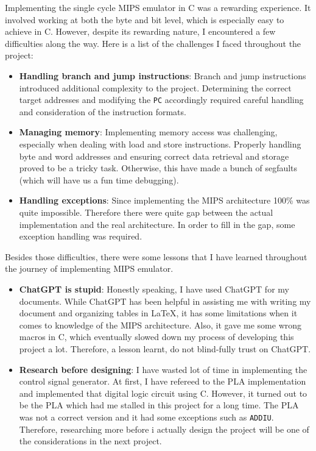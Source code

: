 \documentclass{homework}
\begin{document}
Implementing the single cycle MIPS emulator in C was a rewarding experience. It involved working at both the byte and bit level, which is especially easy to achieve in C. However, despite its rewarding nature, I encountered a few difficulties along the way. Here is a list of the challenges I faced throughout the project:

\begin{itemize}
    \item \textbf{Handling branch and jump instructions}: Branch and jump instructions introduced additional complexity to the project. Determining the correct target addresses and modifying the \texttt{PC} accordingly required careful handling and consideration of the instruction formats.
    \item \textbf{Managing memory}: Implementing memory access was challenging, especially when dealing with load and store instructions. Properly handling byte and word addresses and ensuring correct data retrieval and storage proved to be a tricky task. Otherwise, this have made a bunch of segfaults (which will have us a fun time debugging).
    \item \textbf{Handling exceptions}: Since implementing the MIPS architecture 100\% was quite impossible. Therefore there were quite gap between the actual implementation and the real architecture. In order to fill in the gap, some exception handling was required. 
\end{itemize}
Besides those difficulties, there were some lessons that I have learned throughout the journey of implementing MIPS emulator. 

\begin{itemize}
    \item \textbf{ChatGPT is stupid}: Honestly speaking, I have used ChatGPT for my documents. While ChatGPT has been helpful in assisting me with writing my document and organizing tables in LaTeX, it has some limitations when it comes to knowledge of the MIPS architecture. Also, it gave me some wrong macros in C, which eventually slowed down my process of developing this project a lot. Therefore, a lesson learnt, do not blind-fully trust on ChatGPT.
    \item \textbf{Research before designing}: I have wasted lot of time in implementing the control signal generator. At first, I have refereed to the PLA implementation and implemented that digital logic circuit using C. However, it turned out to be the PLA which had me stalled in this project for a long time. The PLA was not a correct version and it had some exceptions such as \texttt{ADDIU}. Therefore, researching more before i actually design the project will be one of the considerations in the next project. 
\end{itemize}
\end{document}
